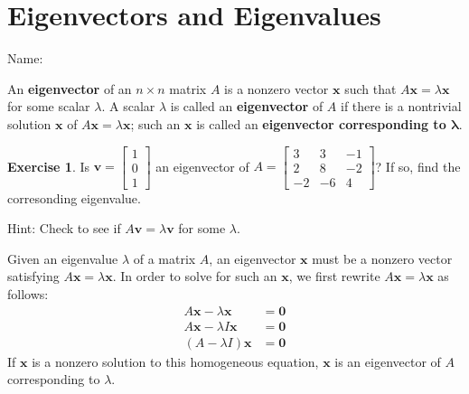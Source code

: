 \documentclass[10pt]{book}
\newcommand{\boxcolor}{gray!30}
\newenvironment{boxme}{\begin{mdframed}[backgroundcolor=\boxcolor,linewidth=0pt,nobreak=true]}{\end{mdframed}}
\newenvironment{boxdef}{\begin{mdframed}[backgroundcolor=\boxcolor,linewidth=0pt,nobreak=true]}{\end{mdframed}}
\theoremstyle{definition}
\newtheorem{exercise}{Exercise}[section]
\newcommand{\name}[1][2.5in]{\vspace{-2.3em}\hfill Name: \underline{\hspace{#1}}}
\newcommand{\vect}[1]{\ensuremath{\boldsymbol{\mathbf{#1}}}}
\newcommand{\Axlx}{A\vect{x}=\lambda\vect{x}}
\begin{document}
\section{Eigenvectors and Eigenvalues}
\name

\begin{boxdef}
	An \textbf{eigenvector} of an $n\times n$ matrix $A$ is a nonzero vector $\vect{x}$ such that $\Axlx$ for some scalar $\lambda$. A scalar $\lambda$ is called an \textbf{eigenvector} of $A$ if there is a nontrivial solution $\vect{x}$ of $\Axlx$; such an $\vect{x}$ is called an \textbf{eigenvector corresponding to $\boldsymbol{\lambda}$}.
\end{boxdef}

\begin{exercise} %
	Is $\vect{v}=\begin{bmatrix}1\\0\\1\end{bmatrix}$ an eigenvector of $A=\begin{bmatrix}3&3&-1\\2&8&-2\\-2&-6&4\end{bmatrix}$? If so, find the corresonding eigenvalue.
	
	Hint: Check to see if $A\vect{v}=\lambda\vect{v}$ for some $\lambda$.
\end{exercise}
\vfill


\begin{boxme}
	Given an eigenvalue $\lambda$ of a matrix $A$, an eigenvector $\vect{x}$ must be a nonzero vector satisfying $\Axlx$. In order to solve for such an $\vect{x}$, we first rewrite $\Axlx$ as follows:
	\begin{align*}
	A\vect{x} - \lambda\vect{x} &= \vect{0} \\
	A\vect{x} - \lambda I\vect{x} &= \vect{0} \\
	(A-\lambda I)\vect{x} &= \vect{0}
	\end{align*}
	If $\vect{x}$ is a nonzero solution to this homogeneous equation, $\vect{x}$ is an eigenvector of $A$ corresponding to $\lambda$.
\end{boxme}
\end{document}
